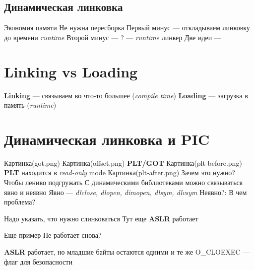 \subsection{Динамическая линковка}
Экономия памяти
Не нужна пересборка
Первый минус --- откладываем линковку до времени \emph{runtime}
Второй минус --- ?
 --- \emph{runtime} линкер
Две идеи --- 


\section{Linking vs Loading}
\textbf{Linking} --- связываем во что-то большее (\emph{compile time})
\textbf{Loading} --- загрузка в память (\emph{runtime})

\section{Динамическая линковка и PIC}
Картинка(got.png)
Картинка(offset.png)
\textbf{PLT/GOT}
Картинка(plt-before.png)
\textbf{PLT} находится в \emph{read-only} mode
Картинка(plt-after.png)
Зачем это нужно? Чтобы лениво подгружать
С динамическими библиотеками можно связываться явно и неявно
Явно --- \emph{dlclose, dlopen, dimopen, dlsym, dlvsym}
Неявно?:
В чем проблема?

Надо указать, что нужно слинковаться
Тут еще \textbf{ASLR} работает

Еще пример
Не работает снова?

\textbf{ASLR} работает, но младшие байты остаются одними и те же
O_CLOEXEC --- флаг для безопасности
